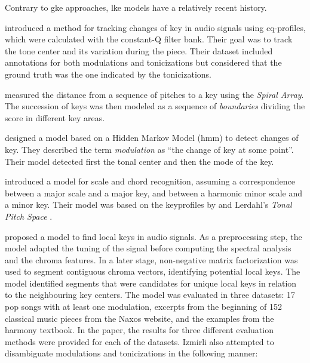 


Contrary to \gls{gke} approaches, \gls{lke} models have a
relatively recent history.

\textcite{purwins2000new} introduced a method for tracking
changes of key in audio signals using cq-profiles, which
were calculated with the constant-Q filter bank. Their goal
was to track the tone center and its variation during the
piece. Their dataset included annotations for both
modulations and tonicizations but considered that the ground
truth was the one indicated by the tonicizations.

\textcite{chew2002spiral} measured the distance from a
sequence of pitches to a key using the \emph{Spiral Array}.
The succession of keys was then modeled as a sequence of
\emph{boundaries} dividing the score in different key areas.

\textcite[469]{chai2005detection} designed a model based
on a Hidden Markov Model (\gls{hmm}) to detect changes of
key. They described the term \emph{modulation} as ``the
change of key at some point''. Their model detected first
the tonal center and then the mode of the key.

\textcite{catteau2007probabilistic} introduced a model for
scale and chord recognition, assuming a correspondence
between a major scale and a major key, and between a
harmonic minor scale and a minor key. Their model was based
on the \gls{keyprofile}s by \textcite{temperley1999whats}
and Lerdahl's \emph{Tonal Pitch Space}
\parencite{lerdahl2005tonal}.

\textcite[1]{izmirli2007localized} proposed a model to
find local keys in audio signals. As a preprocessing step,
the model adapted the tuning of the signal before computing
the spectral analysis and the chroma features. In a later
stage, non-negative matrix factorization was used to segment
contiguous chroma vectors, identifying potential local keys.
The model identified segments that were candidates for
unique local keys in relation to the neighbouring key
centers. The model was evaluated in three datasets: 17 pop
songs with at least one modulation, excerpts from the
beginning of 152 classical music pieces from the Naxos
website, and the examples from the
\textcite{kostka1984tonal} harmony textbook. In the paper,
the results for three different evaluation methods were
provided for each of the datasets. Izmirli also attempted to
disambiguate modulations and tonicizations in the following
manner:

